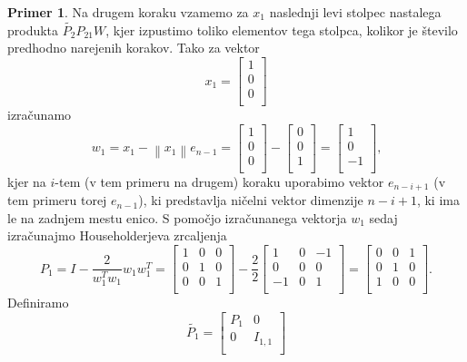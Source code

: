 \documentclass[mat1]{article}
\newcommand{\norm}[1]{\left\lVert#1\right\rVert}
\theoremstyle{definition}
\newtheorem{primer}{Primer}[section]
\begin{document}
\begin{primer}
Na drugem koraku vzamemo za $x_1$ naslednji levi stolpec nastalega produkta $\tilde{P_2} P_{21} W$, kjer izpustimo toliko elementov tega stolpca, kolikor je število predhodno narejenih korakov. Tako za vektor
$$ x_1 = 
\begin{bmatrix}
1\\
0\\
0\\
\end{bmatrix}
$$ 
izračunamo
$$
w_1 = x_1 - \norm{x_1} e_{n-1} = 
\begin{bmatrix}
1\\
0\\
0\\
\end{bmatrix} - 
\begin{bmatrix}
0\\
0\\
1\\
\end{bmatrix} = 
\begin{bmatrix}
1\\
0\\
-1\\
\end{bmatrix}
\text{,}
$$
kjer na $i$-tem (v tem primeru na drugem) koraku uporabimo vektor $e_{n-i+1}$ (v tem primeru torej $e_{n-1}$), ki predstavlja ničelni vektor dimenzije $n-i+1$, ki ima le na zadnjem mestu enico. S pomočjo izračunanega vektorja $w_1$ sedaj izračunajmo Householderjeva zrcaljenja
$$
P_1 = I - \frac{2}{w_1^T w_1} w_1 w_1^T = 
\begin{bmatrix}
1 & 0 & 0 \\
0 & 1 & 0 \\
0 & 0 & 1 \\
\end{bmatrix} - 
\frac{2}{2}
\begin{bmatrix}
1 & 0 & -1 \\
0 & 0 & 0 \\
-1 & 0 & 1  \\
\end{bmatrix} =
\begin{bmatrix}
0 & 0 & 1 \\
0 & 1 & 0 \\
1 & 0 & 0  \\
\end{bmatrix}
\text{.}
$$
Definiramo
$$
\tilde{P_1} = 
\begin{bmatrix}
P_1 & 0 \\
0 & I_{1,1} \\

\end{bmatrix}$$
\end{primer}
\end{document}
